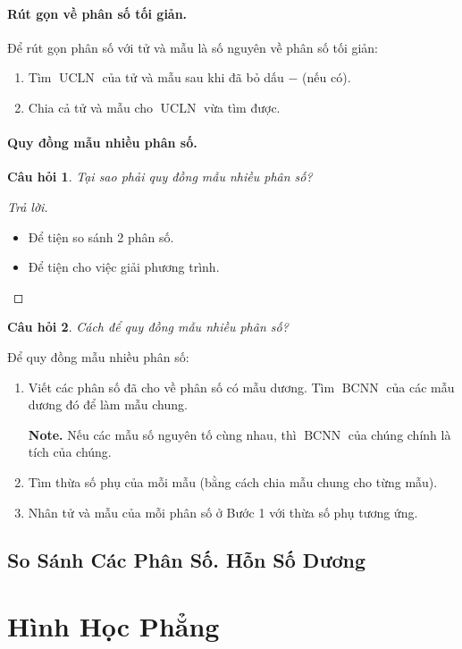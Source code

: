 \documentclass{article}
\numberwithin{equation}{section}
\newtheorem{question}{Câu hỏi}[section]
\begin{document}
\paragraph{Rút gọn về phân số tối giản.}
Để rút gọn phân số với tử và mẫu là số nguyên về phân số tối giản:
\begin{enumerate}
	\item Tìm $\operatorname{UCLN}$ của tử và mẫu sau khi đã bỏ dấu $-$ (nếu có).
	\item Chia cả tử và mẫu cho $\operatorname{UCLN}$ vừa tìm được.
\end{enumerate}

\paragraph{Quy đồng mẫu nhiều phân số.}
\begin{question}
	Tại sao phải quy đồng mẫu nhiều phân số?
\end{question}

\begin{proof}[Trả lời]
	\begin{itemize}
		\item Để tiện so sánh 2 phân số.
		\item Để tiện cho việc giải phương trình.
	\end{itemize}
\end{proof}

\begin{question}
	Cách để quy đồng mẫu nhiều phân số?
\end{question}
Để quy đồng mẫu nhiều phân số:
\begin{enumerate}
	\item Viết các phân số đã cho về phân số có mẫu dương. Tìm $\operatorname{BCNN}$ của các mẫu dương đó để làm mẫu chung.
	
	\textbf{Note.} Nếu các mẫu số nguyên tố cùng nhau, thì $\operatorname{BCNN}$ của chúng chính là tích của chúng.
	\item Tìm thừa số phụ của mỗi mẫu (bằng cách chia mẫu chung cho từng mẫu).
	\item Nhân tử và mẫu của mỗi phân số ở Bước 1 với thừa số phụ tương ứng.
\end{enumerate}

\subsection{So Sánh Các Phân Số. Hỗn Số Dương}

\section{Hình Học Phẳng}
\end{document}
